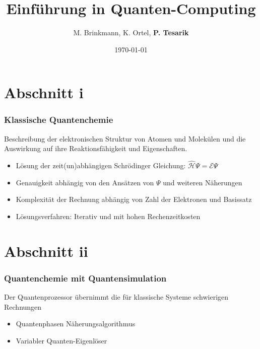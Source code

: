 \documentclass[aspectratio=169]{beamer}
\title{Einf\"uhrung in Quanten-Computing}
\author{M. Brinkmann, K. Ortel, \bf{P. Tesarik}}
\date{\today}
\begin{document}
\maketitle

\section{Abschnitt i}
\begin{frame}
  \frametitle{Klassische Quantenchemie}

  \begin{definition}
    Beschreibung der elektronischen Struktur von Atomen und Molek\"ulen und die Auswirkung auf ihre Reaktionsf\"ahigkeit und Eigenschaften. 
  \end{definition}
  \pause 
  \begin{itemize}
    \item L\"osung der zeit(un)abh\"angigen Schr\"odinger Gleichung: $ \hat{\mathcal{H}} \Psi = \mathcal{E} \Psi $
    \item Genauigkeit abh\"angig von den Ans\"atzen von $ \Psi $ und weiteren N\"aherungen
    \item Komplexit\"at der Rechnung abh\"angig von Zahl der Elektronen und Basissatz
    \item L\"osungsverfahren: Iterativ und mit hohen Rechenzeitkosten 
  \end{itemize}

\end{frame}


\section{Abschnitt ii}
\begin{frame}
  \frametitle{Quantenchemie mit Quantensimulation}
  \begin{definition}
  Der Quantenprozessor \"ubernimmt die f\"ur klassische Systeme schwierigen Rechnungen
  \end{definition}

  \begin{itemize}
  \item Quantenphasen N\"aherungsalgorithmus
  \item Variabler Quanten-Eigenl\"oser
  \end{itemize}
\end{frame} 
\end{document}
